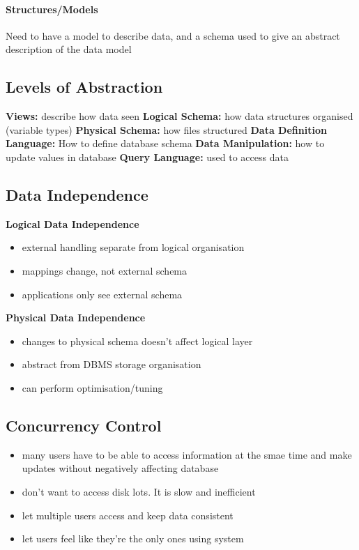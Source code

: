 \documentclass{article}
\newcommand\tab[1][0.5cm]{\hspace*{#1}}
\begin{document}
		\paragraph{Structures/Models}
		Need to have a model to describe data, and a schema used to give an abstract description of the data model

	\subsection{Levels of Abstraction}
		\tab \textbf{Views:} describe how data seen
		\newline \tab \textbf{Logical Schema:} how data structures organised (variable types)
		\newline \tab \textbf{Physical Schema:} how files structured
		\newline \tab \textbf{Data Definition Language:} How to define database schema
		\newline \tab \textbf{Data Manipulation:} how to update values in database 
		\newline \tab \textbf{Query Language:} used to access data 

	\subsection{Data Independence}
		\tab \textbf{Logical Data Independence}
		\begin{itemize}
			\item external handling separate from logical organisation
			\item mappings change, not external schema
			\item applications only see external schema
		\end{itemize}
		\tab \textbf{Physical Data Independence}
		\begin{itemize}
			\item changes to physical schema doesn't affect logical layer
			\item abstract from DBMS storage organisation
			\item can perform optimisation/tuning
		\end{itemize}

	\subsection{Concurrency Control}
		\begin{itemize}
			\item many users have to be able to access information at the smae time and make updates without negatively affecting database
			\item don't want to access disk lots. It is slow and inefficient
			\item let multiple users access and keep data consistent
			\item let users feel like they're the only ones using system

		\end{itemize}
\end{document}
